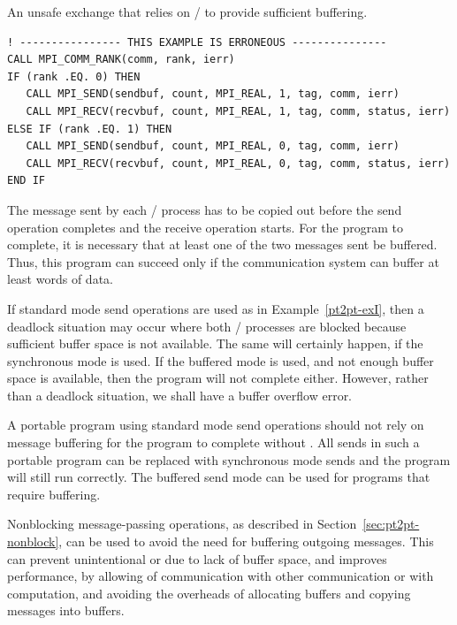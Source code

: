 \begin{example}
\label{pt2pt-exI}
%
%
An unsafe exchange that relies on \MPI/ to provide sufficient buffering.
\begin{lstlisting}[language={[MPI]Fortran}]
! ---------------- THIS EXAMPLE IS ERRONEOUS ---------------
CALL MPI_COMM_RANK(comm, rank, ierr)
IF (rank .EQ. 0) THEN
   CALL MPI_SEND(sendbuf, count, MPI_REAL, 1, tag, comm, ierr)
   CALL MPI_RECV(recvbuf, count, MPI_REAL, 1, tag, comm, status, ierr)
ELSE IF (rank .EQ. 1) THEN
   CALL MPI_SEND(sendbuf, count, MPI_REAL, 0, tag, comm, ierr)
   CALL MPI_RECV(recvbuf, count, MPI_REAL, 0, tag, comm, status, ierr)
END IF
\end{lstlisting}
The message sent by each \MPI/ process has to be copied out before the send operation
completes and the receive operation starts.  For the program to complete, it is
necessary that at least one of the two messages sent be buffered.
Thus, this program can
succeed only if
the communication system can buffer at least  words of data.
\end{example}

\begin{users}
If standard mode send operations are used as in Example~\ref{pt2pt-exI}, then a deadlock situation may occur
where both \MPI/ processes are blocked because sufficient buffer space is not
available.
The same will certainly happen, if the synchronous mode is used.
If the buffered mode is used, and not enough buffer space is available,
then the
program will not complete either.  However, rather than a deadlock situation,
we shall have a buffer overflow error.

A portable program using standard mode send operations should not rely on message
buffering for the program to complete without .
All sends in such a portable program can be replaced
with synchronous mode sends and the program will still run correctly.
The buffered send mode can be used for programs that require buffering.

Nonblocking message-passing operations, as described in
Section~\ref{sec:pt2pt-nonblock}, can be used to avoid the need for buffering
outgoing messages.  This can prevent unintentional  or  due to lack of buffer space, and
improves performance, by allowing  of communication with other communication or with computation,
and avoiding the overheads of allocating buffers and copying messages into
buffers.
\end{users}

